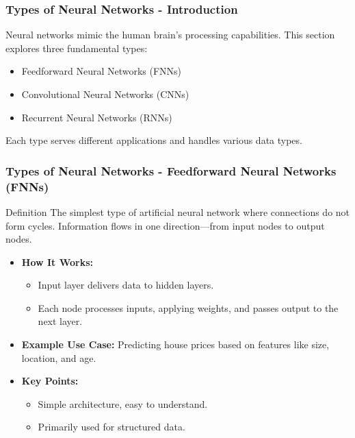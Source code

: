 \documentclass[aspectratio=169]{beamer}
\begin{document}
\begin{frame}[fragile]
    \frametitle{Types of Neural Networks - Introduction}
    Neural networks mimic the human brain's processing capabilities. This section explores three fundamental types:
    \begin{itemize}
        \item Feedforward Neural Networks (FNNs)
        \item Convolutional Neural Networks (CNNs)
        \item Recurrent Neural Networks (RNNs)
    \end{itemize}
    Each type serves different applications and handles various data types.
\end{frame}

\begin{frame}[fragile]
    \frametitle{Types of Neural Networks - Feedforward Neural Networks (FNNs)}
    \begin{block}{Definition}
        The simplest type of artificial neural network where connections do not form cycles. Information flows in one direction—from input nodes to output nodes.
    \end{block}
    
    \begin{itemize}
        \item \textbf{How It Works:}
            \begin{itemize}
                \item Input layer delivers data to hidden layers.
                \item Each node processes inputs, applying weights, and passes output to the next layer.
            \end{itemize}
        \item \textbf{Example Use Case:} Predicting house prices based on features like size, location, and age.
        \item \textbf{Key Points:}
            \begin{itemize}
                \item Simple architecture, easy to understand.
                \item Primarily used for structured data.
            \end{itemize}
    \end{itemize}
\end{frame}
\end{document}
